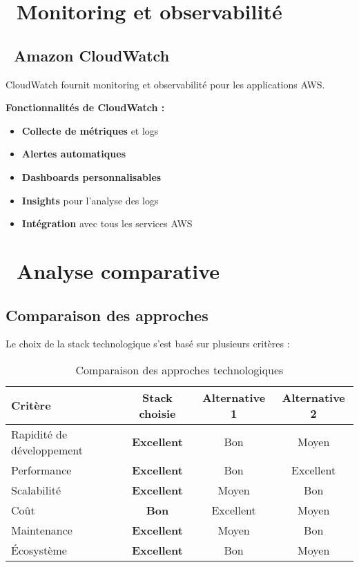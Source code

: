 \section{\faChartLine\ Monitoring et observabilité}

\subsection{\faAws\ Amazon CloudWatch}

CloudWatch fournit monitoring et observabilité pour les applications AWS.

\textbf{\color{primaryblue}Fonctionnalités de CloudWatch :}
\begin{itemize}
    \item \textcolor{accentgreen}{\textbf{Collecte de métriques}} et logs
    \item \textcolor{accentgreen}{\textbf{Alertes automatiques}}
    \item \textcolor{accentgreen}{\textbf{Dashboards personnalisables}}
    \item \textcolor{accentgreen}{\textbf{Insights}} pour l'analyse des logs
    \item \textcolor{accentgreen}{\textbf{Intégration}} avec tous les services AWS
\end{itemize}

\section{\faBalanceScale\ Analyse comparative}

\subsection{Comparaison des approches}

Le choix de la stack technologique s'est basé sur plusieurs critères :

\begin{table}[H]
\centering
\caption{\color{primaryblue}Comparaison des approches technologiques}
\begin{tabular}{|l|c|c|c|}
\hline
\rowcolor{lightgray}
\textbf{Critère} & \textbf{\color{primaryblue}Stack choisie} & \textbf{Alternative 1} & \textbf{Alternative 2} \\
\hline
Rapidité de développement & \textcolor{accentgreen}{\textbf{Excellent}} & Bon & Moyen \\
\hline
Performance & \textcolor{accentgreen}{\textbf{Excellent}} & Bon & Excellent \\
\hline
Scalabilité & \textcolor{accentgreen}{\textbf{Excellent}} & Moyen & Bon \\
\hline
Coût & \textcolor{accentgreen}{\textbf{Bon}} & Excellent & Moyen \\
\hline
Maintenance & \textcolor{accentgreen}{\textbf{Excellent}} & Moyen & Bon \\
\hline
Écosystème & \textcolor{accentgreen}{\textbf{Excellent}} & Bon & Moyen \\
\hline
\end{tabular}
\end{table}

